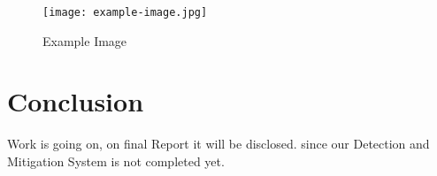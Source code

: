 \documentclass[12pt,twocolumn]{article}
\begin{document}
\begin{figure}[htbp]
    \centering
    \texttt{[image: example-image.jpg]}
    \caption{Example Image}
    \label{fig:example}
\end{figure}


\section{Conclusion}
Work is going on, on final Report it will be disclosed.
since our Detection and Mitigation System is not completed yet.
\end{document}
